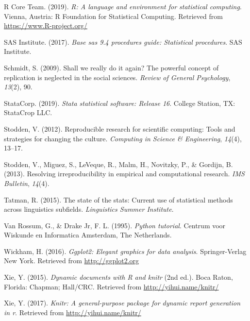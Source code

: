 \documentclass[
  english,
  ,man]{apa6}
\begin{document}
\leavevmode\hypertarget{ref-rpro}{}%
R Core Team. (2019). \emph{R: A language and environment for statistical computing}. Vienna, Austria: R Foundation for Statistical Computing. Retrieved from \url{https://www.R-project.org/}

\leavevmode\hypertarget{ref-sas2017base}{}%
SAS Institute. (2017). \emph{Base sas 9.4 procedures guide: Statistical procedures}. SAS Institute.

\leavevmode\hypertarget{ref-schmidt2009}{}%
Schmidt, S. (2009). Shall we really do it again? The powerful concept of replication is neglected in the social sciences. \emph{Review of General Psychology}, \emph{13}(2), 90.

\leavevmode\hypertarget{ref-stata}{}%
StataCorp. (2019). \emph{Stata statistical software: Release 16}. College Station, TX: StataCrop LLC.

\leavevmode\hypertarget{ref-stodden2012}{}%
Stodden, V. (2012). Reproducible research for scientific computing: Tools and strategies for changing the culture. \emph{Computing in Science \& Engineering}, \emph{14}(4), 13--17.

\leavevmode\hypertarget{ref-stodden2013}{}%
Stodden, V., Miguez, S., LeVeque, R., Malm, H., Novitzky, P., \& Gordijn, B. (2013). Resolving irreproducibility in empirical and computational research. \emph{IMS Bulletin}, \emph{14}(4).

\leavevmode\hypertarget{ref-tatman2015}{}%
Tatman, R. (2015). The state of the stats: Current use of statistical methods across linguistics subfields. \emph{Linguistics Summer Institute}.

\leavevmode\hypertarget{ref-van1995python}{}%
Van Rossum, G., \& Drake Jr, F. L. (1995). \emph{Python tutorial}. Centrum voor Wiskunde en Informatica Amsterdam, The Netherlands.

\leavevmode\hypertarget{ref-ggplot2}{}%
Wickham, H. (2016). \emph{Ggplot2: Elegant graphics for data analysis}. Springer-Verlag New York. Retrieved from \url{http://ggplot2.org}

\leavevmode\hypertarget{ref-knitr}{}%
Xie, Y. (2015). \emph{Dynamic documents with R and knitr} (2nd ed.). Boca Raton, Florida: Chapman; Hall/CRC. Retrieved from \url{http://yihui.name/knitr/}

\leavevmode\hypertarget{ref-knitrmanual}{}%
Xie, Y. (2017). \emph{Knitr: A general-purpose package for dynamic report generation in r}. Retrieved from \url{http://yihui.name/knitr/}
\end{document}
